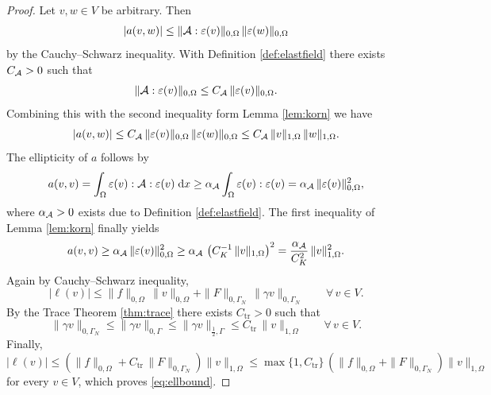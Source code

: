 \begin{proof}
	Let $v,w\in V$ be arbitrary. Then
	\begin{equation*}
		|a(v,w)|\le \|{\mathcal A}:\varepsilon(v)\|_{0,\Omega}\,\|\varepsilon(w)\|_{0,\Omega}
	\end{equation*}
	by the Cauchy--Schwarz inequality. With Definition \ref{def:elastfield} there exists $C_{\mathcal A}>0$ such that
	\begin{equation*}
		\|{\mathcal A}:\varepsilon(v)\|_{0,\Omega}\le C_{\mathcal A}\,\|\varepsilon(v)\|_{0,\Omega}.
	\end{equation*}
	Combining this with the second inequality form Lemma \ref{lem:korn} we have
	\begin{equation*}
		|a(v,w)|\le C_{\mathcal A}\,\|\varepsilon(v)\|_{0,\Omega}\,\|\varepsilon(w)\|_{0,\Omega}\le C_{\mathcal A}\,\|v\|_{1,\Omega}\,\|w\|_{1,\Omega}.
	\end{equation*}
	The ellipticity of $a$ follows by
	\begin{equation*}
		a(v,v) = \int_\Omega \varepsilon(v):{\mathcal A}:\varepsilon(v)\;{{\mathrm{d}} x} \ge \alpha_{\mathcal A}\int_\Omega\varepsilon(v):\varepsilon(v) = \alpha_{\mathcal A}\,\|\varepsilon(v)\|^2_{0,\Omega},
	\end{equation*}
	where $\alpha_{\mathcal A}>0$ exists due to Definition \ref{def:elastfield}. The first inequality of Lemma \ref{lem:korn} finally yields
	\begin{equation*}
		a(v,v)\ge \alpha_{\mathcal A}\,\|\varepsilon(v)\|_{0,\Omega}^2\ge \alpha_{\mathcal A}\,\left(C_K^{-1}\,\|v\|_{1,\Omega}\right)^2 = \frac{\alpha_{\mathcal A}}{C_K^2}\,\|v\|_{1,\Omega}^2.
	\end{equation*}
	Again by Cauchy--Schwarz inequality,
	\begin{equation*}
		|\ell(v)|\le \|f\|_{0,\Omega}\,\|v\|_{0,\Omega}+\|F\|_{0,\Gamma_N}\,\|\gamma v\|_{0,\Gamma_N}\qquad \forall\, v\in V.
	\end{equation*}
	By the Trace Theorem \ref{thm:trace} there exists $C_\mathrm{tr}>0$ such that
	\begin{equation*}
		\|\gamma v\|_{0,\Gamma_N}\le \|\gamma v\|_{0,\Gamma}\le \|\gamma v\|_{\tfrac12,\Gamma}\le C_\mathrm{tr}\,\|v\|_{1,\Omega} \qquad \forall\, v\in V.
	\end{equation*}
	Finally,
	\begin{equation*}
		|\ell(v)|\le \left(\|f\|_{0,\Omega} + C_{\mathrm{tr}}\,\|F\|_{0,\Gamma_N}\right)\|v\|_{1,\Omega}\le \max\{1,C_\mathrm{tr}\}\,\left(\|f\|_{0,\Omega}+\|F\|_{0,\Gamma_N}\right)\|v\|_{1,\Omega}
	\end{equation*}
	for every $v\in V$, which proves \eqref{eq:ellbound}.
\end{proof}

